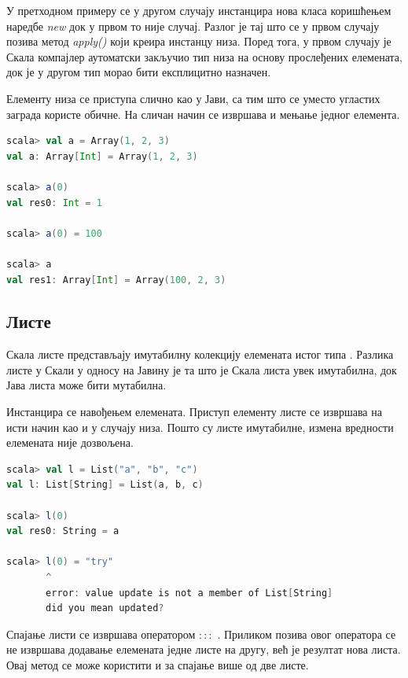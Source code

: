\documentclass[12pt,oneside]{memoir}
\begin{document}
У претходном примеру се у другом случају инстанцира нова класа коришћењем наредбе \textit{new} док у првом то није случај. Разлог је тај што се у првом случају позива метод \textit{apply()} који креира инстанцу низа. Поред тога, у првом случају је Скала компајлер аутоматски закључио тип низа на основу прослеђених елемената, док је у другом тип морао бити експлицитно назначен.

Елементу низа се приступа слично као у Јави, са тим што се уместо угластих заграда користе обичне. На сличан начин се извршава и мењање једног елемента.

\begin{lstlisting}[language=Scala, caption={Приступ и измена елемента низа}, label={lst:scala_coll_array_get_set}]
scala> val a = Array(1, 2, 3)
val a: Array[Int] = Array(1, 2, 3)

scala> a(0)
val res0: Int = 1

scala> a(0) = 100

scala> a
val res1: Array[Int] = Array(100, 2, 3)
\end{lstlisting}

\subsection{Листе}
\label{subsec:scala_lists}

Скала листе представљају имутабилну колекцију елемената истог типа \cite{scala_prog}. Разлика листе у Скали у односу на Јавину је та што је Скала листа увек имутабилна, док Јава листа може бити мутабилна. 

Инстанцира се навођењем елемената. Приступ елементу листе се извршава на исти начин као и у случају низа. Пошто су листе имутабилне, измена вредности елемената није дозвољена.

\begin{lstlisting}[language=Scala, caption={Пример Скала листе}, label={lst:scala_coll_lists_example}]
scala> val l = List("a", "b", "c")
val l: List[String] = List(a, b, c)

scala> l(0)
val res0: String = a

scala> l(0) = "try"
       ^
       error: value update is not a member of List[String]
       did you mean updated?
\end{lstlisting}

Спајање листи се извршава оператором $:::$ \cite{scala_prog}. Приликом позива овог оператора се не извршава додавање елемената једне листе на другу, већ је резултат нова листа. Овај метод се може користити и за спајање више од две листе.
\end{document}
